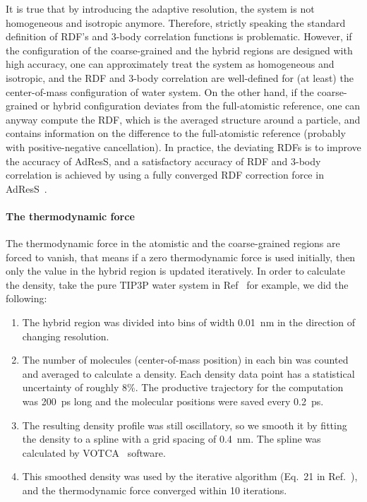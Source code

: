 \documentclass[epjST]{svjour}
\newcommand{\redc}[1]{{\color{red} #1}}
\begin{document}
It is true that by introducing the adaptive resolution, the system is not homogeneous
and isotropic anymore. Therefore, strictly speaking the standard definition
of RDF's and 3-body correlation functions is problematic. However, if the configuration
of the coarse-grained and the
hybrid regions are designed with high accuracy, one can approximately
treat the system as homogeneous and isotropic, and the RDF and 3-body correlation
are well-defined for (at least) the center-of-mass configuration of water system.
On the other hand, if the coarse-grained or hybrid
configuration deviates from the full-atomistic reference,
one can anyway compute the RDF,
which is the averaged structure around a particle, and contains information on
the difference to the
full-atomistic reference (probably with positive-negative cancellation).
\redc{In practice,
the deviating RDFs is to improve the accuracy of AdResS,} and a
satisfactory accuracy of RDF and 3-body correlation is achieved by
using a fully converged RDF correction force in
AdResS~\cite{wang2012adaptive,wang2013grand}.


\paragraph{The thermodynamic force}
The thermodynamic force in the atomistic and the coarse-grained
regions are forced to vanish, that means if a zero thermodynamic force
is used initially, then only the value in the hybrid region is updated
iteratively. In order to calculate the density,
take the pure TIP3P water system in Ref~\cite{wang2015adaptive}
for example, we did the following:
\begin{enumerate}
\item The hybrid region was divided into bins of width 0.01~nm in the
  direction of changing resolution.
\item The number of molecules (center-of-mass position) in
  each bin was counted and averaged to calculate a density. Each density data point
  has a statistical uncertainty of roughly 8\%.
  The productive trajectory for the computation was 200~ps long
  and the molecular positions were saved every 0.2~ps.
\item The resulting density profile was still oscillatory,
  so we smooth it by fitting the density
  to a  spline with a grid spacing of 0.4~nm.
  The spline was calculated by VOTCA~\cite{ruehle2009versatile} software.
\item This smoothed density was used
  by the iterative algorithm (Eq.~21 in Ref.~\cite{wang2015adaptive}),
  and the thermodynamic force converged within 10 iterations.
\end{enumerate}
\end{document}
